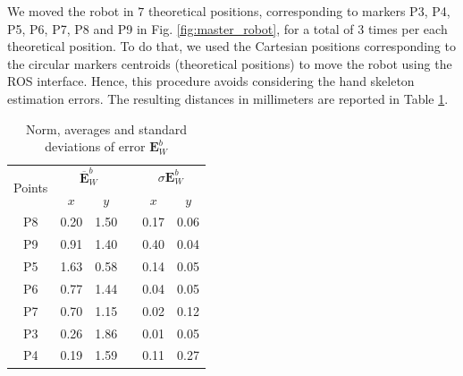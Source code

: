 \documentclass[a4paper, 10 pt, conference]{ieeeconf}      %
\begin{document}
We moved the robot in $7$ theoretical positions, corresponding to markers P3, P4, P5, P6, P7, P8 and P9 in Fig. \ref{fig:master_robot}, for a total of $3$ times per each theoretical position. To do that, we used the Cartesian positions corresponding to the circular markers centroids (theoretical positions) to move the robot using the ROS interface. Hence, this procedure avoids considering the hand skeleton estimation errors.
The resulting distances in millimeters are reported in Table \ref{tab:laser}.


\begin{table}[h!]
	\centering
	\caption{Norm, averages and standard deviations of error $\mathbf{E}^b_{W}$}
	\label{tab:laser}
	\begin{adjustbox}{max width=\textwidth}
		\begin{tabular}{@{}cccccc@{}}
			\toprule
			\multirow{2}{*}{Points} & \multicolumn{2}{c}{$\overline{\mathbf{E}}^b_{W}$} &  & \multicolumn{2}{c}{$\sigma{\mathbf{E}}^b_{W}$} \\ \cmidrule(lr){2-3} \cmidrule(l){5-6} 
			& $x$                     & $y$                    &  & $x$                   & $y$                   \\ \midrule
			P8                     & 0.20                    & 1.50                   &  & 0.17                  & 0.06                  \\
			P9                     & 0.91                    & 1.40                   &  & 0.40                  & 0.04                  \\
			P5                     & 1.63                    & 0.58                   &  & 0.14                  & 0.05                  \\
			P6                   & 0.77                    & 1.44                   &  & 0.04                  & 0.05                  \\
			P7                      & 0.70                    & 1.15                   &  & 0.02                  & 0.12                  \\
			P3                      & 0.26                    & 1.86                   &  & 0.01                  & 0.05                  \\
			P4                      & 0.19                    & 1.59                   &  & 0.11                  & 0.27                  \\ \bottomrule
		\end{tabular}%
	\end{adjustbox}
\end{table}
\end{document}
